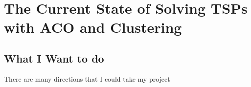 \chapter{The Current State of Solving TSPs with ACO and Clustering}


\section{What I Want to do}
There are many directions that I could take my project 